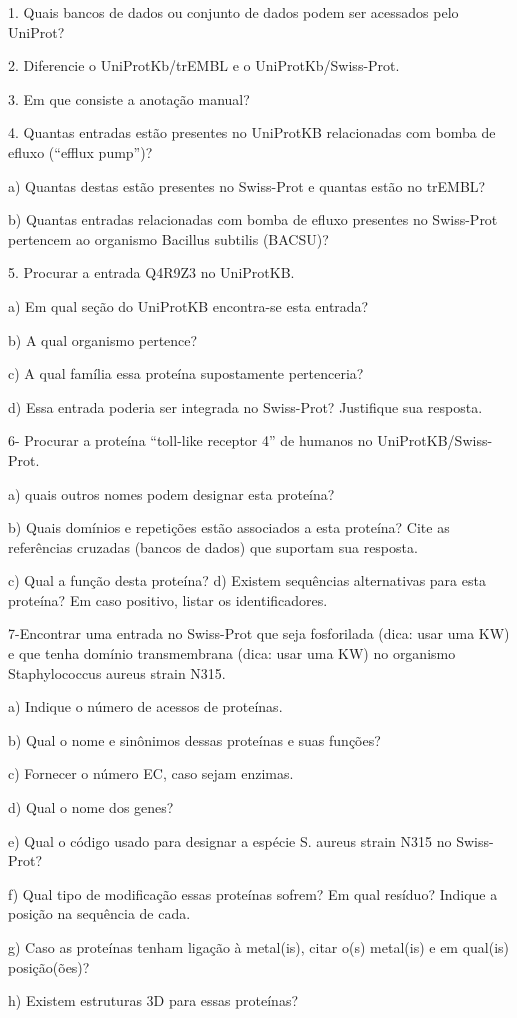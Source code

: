 1. Quais bancos de dados ou conjunto de dados podem ser acessados pelo UniProt?



2. Diferencie o UniProtKb/trEMBL e o UniProtKb/Swiss-Prot.



3. Em que consiste a anotação manual?



4. Quantas entradas estão presentes no UniProtKB relacionadas com bomba de efluxo (“efflux pump”)?

a) Quantas destas estão presentes no Swiss-Prot e quantas estão no trEMBL? 
 
b) Quantas entradas relacionadas com bomba de efluxo presentes no Swiss-Prot pertencem ao organismo Bacillus subtilis (BACSU)?



5. Procurar a entrada Q4R9Z3 no UniProtKB.

a) Em qual seção do UniProtKB encontra-se esta entrada?

b) A qual organismo pertence?

c) A qual família essa proteína supostamente pertenceria?

d) Essa entrada poderia ser integrada no Swiss-Prot? Justifique sua resposta.



6- Procurar a proteína “toll-like receptor 4” de humanos no UniProtKB/Swiss-Prot.

a) quais outros nomes podem designar esta proteína?

b) Quais domínios e repetições estão associados a esta proteína? Cite as referências cruzadas (bancos de dados) que suportam sua resposta.

c) Qual a função desta proteína?
d) Existem sequências alternativas para esta proteína? Em caso positivo, listar os identificadores.

7-Encontrar uma entrada no Swiss-Prot que seja fosforilada (dica: usar uma KW) e que tenha domínio transmembrana (dica: usar uma KW) no organismo Staphylococcus aureus strain N315.
    
a) Indique o número de acessos de proteínas. 

b) Qual o nome e sinônimos dessas proteínas e suas funções?

c) Fornecer o número EC, caso sejam enzimas.

d) Qual o nome dos genes?

e)  Qual o código usado para designar a espécie S. aureus strain N315 no Swiss-Prot?

f)  Qual tipo de modificação essas proteínas sofrem? Em qual resíduo? Indique a posição na sequência de cada.

g) Caso as proteínas tenham ligação à metal(is), citar o(s) metal(is) e em qual(is) posição(ões)?

h) Existem estruturas 3D para essas proteínas?
